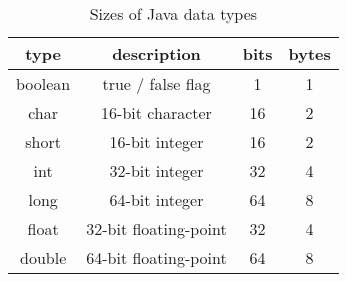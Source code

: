 \documentclass[../index.tex]{subfiles}
\begin{document}
\begin{frame}{\currenttitle}
  \begin{table}
    \begin{tabular}{c c c c}
      type & description & bits & bytes \\
      \hline{}
      boolean & true / false flag & 1 & 1\footnotemark \\
      char & 16-bit character & 16 & 2 \\
      short & 16-bit integer & 16 & 2 \\
      int & 32-bit integer & 32 & 4 \\
      long & 64-bit integer & 64 & 8 \\
      float & 32-bit floating-point & 32 & 4 \\
      double & 64-bit floating-point & 64 & 8 \\
    \end{tabular}
    \caption{Sizes of Java data types}
  \end{table}

\end{frame}

\begin{frame}{\currenttitle}

\end{frame}


\end{document}
